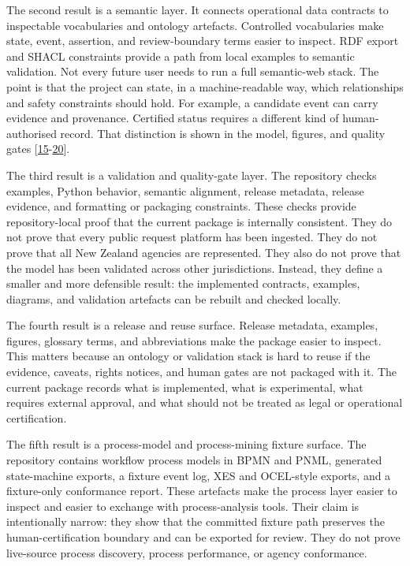 \documentclass[
]{article}
\begin{document}
The second result is a semantic layer. It connects operational data
contracts to inspectable vocabularies and ontology artefacts. Controlled
vocabularies make state, event, assertion, and review-boundary terms
easier to inspect. RDF export and SHACL constraints provide a path from
local examples to semantic validation. Not every future user needs to
run a full semantic-web stack. The point is that the project can state,
in a machine-readable way, which relationships and safety constraints
should hold. For example, a candidate event can carry evidence and
provenance. Certified status requires a different kind of
human-authorised record. That distinction is shown in the model,
figures, and quality gates {[}\hyperlink{ref-15}{15}-\hyperlink{ref-20}{20}{]}.

The third result is a validation and quality-gate layer. The repository
checks examples, Python behavior, semantic alignment, release metadata,
release evidence, and formatting or packaging constraints. These checks
provide repository-local proof that the current package is internally
consistent. They do not prove that every public request platform has
been ingested. They do not prove that all New Zealand agencies are
represented. They also do not prove that the model has been validated
across other jurisdictions. Instead, they define a smaller and more
defensible result: the implemented contracts, examples, diagrams, and
validation artefacts can be rebuilt and checked locally.

The fourth result is a release and reuse surface. Release metadata,
examples, figures, glossary terms, and abbreviations make the package
easier to inspect. This matters because an ontology or validation stack
is hard to reuse if the evidence, caveats, rights notices, and human
gates are not packaged with it. The current package records what is
implemented, what is experimental, what requires external approval, and
what should not be treated as legal or operational certification.

The fifth result is a process-model and process-mining fixture surface.
The repository contains workflow process models in BPMN and PNML,
generated state-machine exports, a fixture event log, XES and OCEL-style
exports, and a fixture-only conformance report. These artefacts make the
process layer easier to inspect and easier to exchange with
process-analysis tools. Their claim is intentionally narrow: they show
that the committed fixture path preserves the human-certification
boundary and can be exported for review. They do not prove live-source
process discovery, process performance, or agency conformance.
\end{document}
